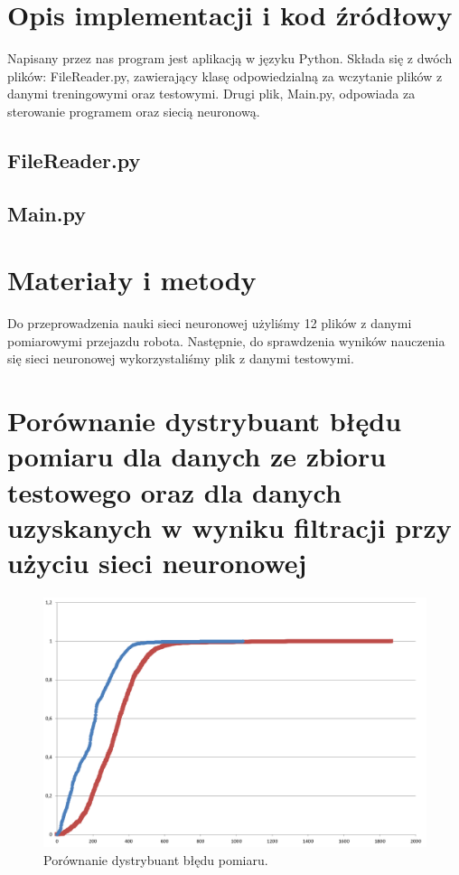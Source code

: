 \documentclass{classrep}
\begin{document}
\section{Opis implementacji i kod źródłowy} 
Napisany przez nas program jest aplikacją w języku Python. Składa się z dwóch plików: FileReader.py, zawierający klasę odpowiedzialną za wczytanie plików z danymi treningowymi oraz testowymi. Drugi plik, Main.py, odpowiada za sterowanie programem oraz siecią neuronową.

\subsection{FileReader.py}



\subsection{Main.py}




\section{Materiały i metody}
Do przeprowadzenia nauki sieci neuronowej użyliśmy 12 plików z danymi pomiarowymi przejazdu robota. Następnie, do sprawdzenia wyników nauczenia się sieci neuronowej wykorzystaliśmy plik z danymi testowymi. \cite{pliki}

\section{Porównanie dystrybuant błędu pomiaru dla danych ze zbioru testowego oraz dla danych uzyskanych w wyniku filtracji przy użyciu sieci neuronowej}

\begin{figure}[h!]
	\centering
	\includegraphics[width=1\textwidth]{dystrybuanta.png}
	\caption{Porównanie dystrybuant błędu pomiaru.}
	\label{dystrybuanta}
\end{figure}
\end{document}
